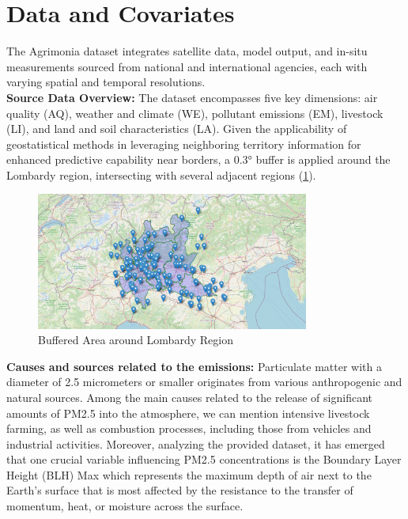 \documentclass[12pt,a4paper]{article}
\begin{document}
\section{Data and Covariates}
The Agrimonia dataset integrates satellite data, model output, and in-situ measurements sourced from national and international agencies, each with varying spatial and temporal resolutions. 
\\
\textbf{Source Data Overview:}
The dataset encompasses five key dimensions: air quality (AQ), weather and climate (WE), pollutant emissions (EM), livestock (LI), and land and soil characteristics (LA). Given the applicability of geostatistical methods in leveraging neighboring territory information for enhanced predictive capability near borders, a 0.3° buffer is applied around the Lombardy region, intersecting with several adjacent regions (\cref{fig:buffered_area}).

\begin{figure}
    \centering
    
    \includegraphics[width=0.8\textwidth]{./imgs/maps/mappa.png}
    \caption{Buffered Area around Lombardy Region}
    \label{fig:buffered_area}
\end{figure}
\textbf{Causes and sources related to the emissions:}
Particulate matter with a diameter of 2.5 micrometers or smaller originates from various anthropogenic and natural sources. Among the main causes related to the release of significant amounts of PM2.5 into the atmosphere, we can mention intensive livestock farming, as well as combustion processes, including those from vehicles and industrial activities.
Moreover, analyzing the provided dataset, it has emerged that one crucial variable influencing PM2.5 concentrations is the Boundary Layer Height (BLH) Max which represents the maximum depth of air next to the Earth's surface that is most affected by the resistance to the transfer of momentum, heat, or moisture across the surface. 
\end{document}
